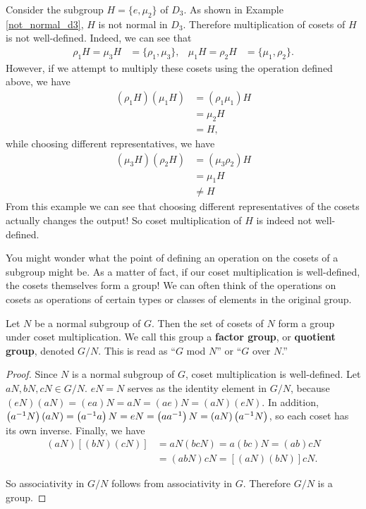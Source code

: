 \begin{example}
Consider the subgroup $H = \{e, \mu_2\}$ of $D_3$. As shown in Example \ref{not_normal_d3}, $H$ is not normal in $D_3$. Therefore multiplication of cosets of $H$ is not well-defined. Indeed, we can see that
\begin{align*}
    \rho_1H = \mu_3H &= \{\rho_1, \mu_3\}, & \mu_1H = \rho_2H &= \{\mu_1, \rho_2\}.
\end{align*}
However, if we attempt to multiply these cosets using the operation defined above, we have
\begin{align*}
    \left(\rho_1H\right)\left(\mu_1H\right) &= \left(\rho_1 \mu_1\right)H \\
    &= \mu_2 H \\
    &= H,
\end{align*}
while choosing different representatives, we have
\begin{align*}
    \left(\mu_3H\right)\left(\rho_2H\right) &= \left(\mu_3 \rho_2\right)H \\
    &= \mu_1 H \\
    &\neq H
\end{align*}
From this example we can see that choosing different representatives of the cosets actually changes the output! So coset multiplication of $H$ is indeed not well-defined.
\end{example}

You might wonder what the point of defining an operation on the cosets of a subgroup might be. As a matter of fact, if our coset multiplication is well-defined, the cosets themselves form a group! We can often think of the operations on cosets as operations of certain types or classes of elements in the original group.

\begin{theorem}
Let $N$ be a normal subgroup of $G$. Then the set of cosets of $N$ form a group under coset multiplication. We call this group a \textbf{factor group}, or \textbf{quotient group}, denoted $G/N$. This is read as ``$G$ mod $N$'' or ``$G$ over $N$.''
\end{theorem}

\begin{proof}
Since $N$ is a normal subgroup of $G$, coset multiplication is well-defined. Let $aN, bN, cN \in G/N$. $eN = N$ serves as the identity element in $G/N$, because $(eN)(aN) = (ea)N = aN = (ae)N = (aN)(eN)$. In addition, $\left(a^{-1} N\right)(aN) = \left(a^{-1} a\right)N = eN = \left(a a^{-1}\right)N = (aN)\left(a^{-1} N\right)$, so each coset has its own inverse. Finally, we have
\begin{align*}
    (aN)\left[(bN)(cN)\right] &= aN(bcN) = a(bc)N = (ab)cN \\
    &= (abN)cN = \left[(aN)(bN)\right]cN.
\end{align*}

So associativity in $G/N$ follows from associativity in $G$. Therefore $G/N$ is a group.

\end{proof}

